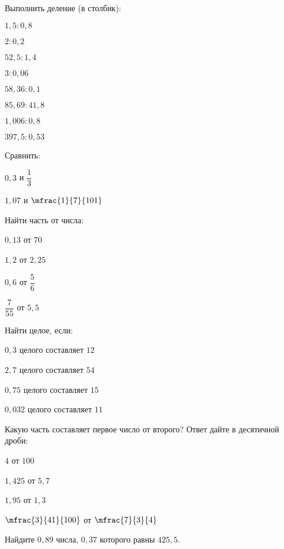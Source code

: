 %
%
\begin{homework}[number=1]
	\begin{listofex}
		\item Выполнить деление (в столбик):
		\begin{enumcols}[itemcolumns=4]
			\item \( 1,5:0,8 \)
			\item \( 2:0,2 \)
			\item \( 52,5:1,4 \)
			\item \( 3:0,06 \)
			\item \( 58,36:0,1 \)
			\item \( 85,69:41,8 \)
			\item \( 1,006:0,8 \)
			\item \( 397,5:0,53 \)
		\end{enumcols}
		\item Сравнить:
		\begin{enumcols}[itemcolumns=2]
			\item \( 0,3 \) и \( \dfrac{1}{3} \)
			\item \( 1,07 \) и \( \mfrac{1}{7}{101} \)
		\end{enumcols}
		\item Найти часть от числа:
		\begin{enumcols}[itemcolumns=4]
			\item \( 0,13 \) от \( 70 \)
			\item \( 1,2 \) от \( 2,25 \)
			\item \( 0,6 \) от \( \dfrac{5}{6} \)
			\item \( \dfrac{7}{55} \) от \( 5,5 \)
		\end{enumcols}
		\item Найти целое, если:
		\begin{enumcols}[itemcolumns=2]
			\item \( 0,3 \) целого составляет \( 12 \)
			\item \( 2,7 \) целого составляет \( 54 \)
			\item \( 0,75 \) целого составляет \( 15 \)
			\item \( 0,032 \) целого составляет \( 11 \)
		\end{enumcols}
		\item Какую часть составляет первое число от второго? Ответ дайте в десятичной дроби:
		\begin{enumcols}[itemcolumns=4]
			\item \( 4 \) от \( 100 \)
			\item \( 1,425 \) от \( 5,7 \)
			\item \( 1,95 \) от \( 1,3 \)
			\item \( \mfrac{3}{41}{100} \) от \( \mfrac{7}{3}{4} \)
		\end{enumcols}
		\item Найдите \( 0,89 \) числа, \( 0,37 \) которого равны \( 425,5 \).
	\end{listofex}
\end{homework}
